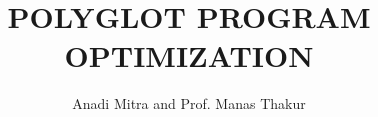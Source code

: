 \documentclass{beamer}
\title{POLYGLOT PROGRAM OPTIMIZATION}
\author{Anadi Mitra \hspace{3mm} and \hspace{3mm} Prof. Manas Thakur}
\newlength{\sepwidth}
\newlength{\colwidth}
\newcommand{\separatorcolumn}{\begin{column}{\sepwidth}\end{column}}
\begin{document}

\begin{frame}[t]
\begin{columns}[t]
\separatorcolumn
\begin{column}{\colwidth}
  \vspace{30mm}
  
  \vspace{30mm}
  
  \vspace{20mm}
  
  \vspace{40mm}
  
  \vspace{30mm}
  
\end{column}
\separatorcolumn
\begin{column}{\colwidth}

  \vspace{30mm}
  
  \vspace{50mm}
  
  \vspace{50mm}
  
  \vspace{40mm}
  
  \vspace{50mm}
  
%  
%  

  \vspace{30mm}
  


%  
\end{column}
\end{columns}

\end{frame}
\end{document}

